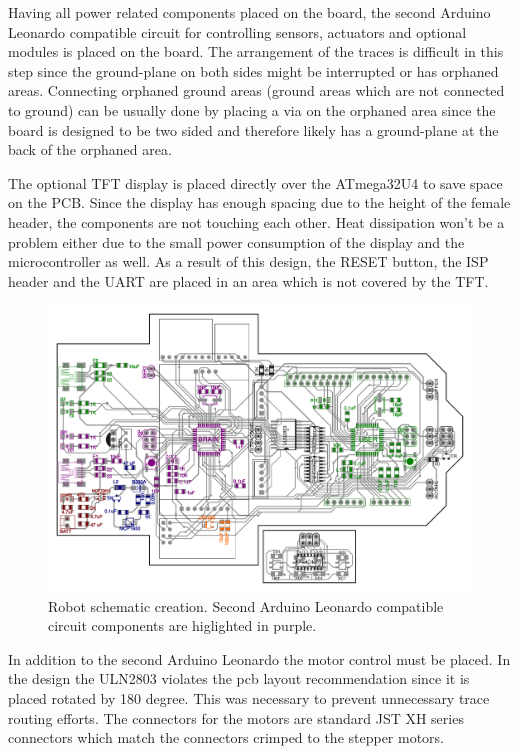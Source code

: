 Having all power related components placed on the board, the second Arduino Leonardo compatible circuit for controlling sensors, actuators and optional modules is placed on the board. The arrangement of the traces is difficult in this step since the ground-plane on both sides might be interrupted or has orphaned areas. Connecting orphaned ground areas (ground areas which are not connected to ground) can be usually done by placing a via on the orphaned area since the board is designed to be two sided and therefore likely has a ground-plane at the back of the orphaned area.

The optional TFT display is placed directly over the ATmega32U4 to save space on the PCB. Since the display has enough spacing due to the height of the female header, the components are not touching each other. Heat dissipation won't be a problem either due to the small power consumption of the display and the microcontroller as well. As a result of this design, the RESET button, the ISP header and the UART are placed in an area which is not covered by the TFT.

\begin{figure}[H]
  \centering
  \includegraphics[width=\textwidth]{images/schematic/robot_schematic_brain.pdf}
  \caption{Robot schematic creation. Second Arduino Leonardo compatible circuit components are higlighted in purple.}
\end{figure}

In addition to the second Arduino Leonardo the motor control must be placed. In the design the ULN2803 violates the pcb layout recommendation since it is placed rotated by 180 degree. This was necessary to prevent unnecessary  trace routing efforts. The connectors for the motors are standard JST XH series connectors which match the connectors crimped to the stepper motors.

